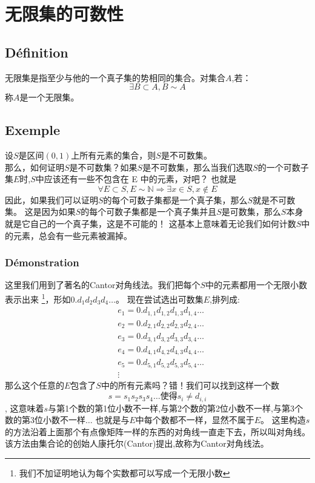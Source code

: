 \documentclass[12pt, a4paper, oneside]{ctexbook}
\begin{document}
\section{无限集的可数性}
  \subsection{Définition}
  无限集是指至少与他的一个真子集的势相同的集合。对集合$A$,若：
  $$
    \exists B\subset A, B\sim A
  $$
  称$A$是一个无限集。
  \subsection{Exemple}
  设$S$是区间$(0,1)$上所有元素的集合，则$S$是不可数集。\\

  那么，如何证明$S$是不可数集？如果$S$是不可数集，那么当我们选取$S$的一个可数子集$E$时,$S$中应该还有一些不包含在 E 中的元素，对吧？
  也就是
  $$
    \forall E\subset S,E\sim \mathbb{N}\Rightarrow \exists x\in S,x\notin E 
  $$
  因此，如果我们可以证明$S$的每个可数子集都是一个真子集，那么$S$就是不可数集。
  这是因为如果$S$的每个可数子集都是一个真子集并且$S$是可数集，那么$S$本身就是它自己的一个真子集，这是不可能的！
  这基本上意味着无论我们如何计数$S$中的元素，总会有一些元素被漏掉。
  \subsubsection{Démonstration}
  这里我们用到了著名的Cantor对角线法。我们把每个$S$中的元素都用一个无限小数表示出来
  \footnote{我们不加证明地认为每个实数都可以写成一个无限小数}，形如$0.d_1d_2d_3d_4\dots$。
  现在尝试选出可数集$E$,排列成:
  $$
  \begin{aligned}&
    e_1=0.d_{1,1}d_{1,2}d_{1,3}d_{1,4}\dots\\ &
    e_2=0.d_{2,1}d_{2,2}d_{2,3}d_{2,4}\dots\\ &
    e_3=0.d_{3,1}d_{3,2}d_{3,3}d_{3,4}\dots\\ &
    e_4=0.d_{4,1}d_{4,2}d_{4,3}d_{4,4}\dots\\ &
    e_5=0.d_{5,1}d_{5,2}d_{5,3}d_{5,4}\dots\\ &
    \vdots 
      \end{aligned}
  $$
  那么这个任意的$E$包含了$S$中的所有元素吗？错！我们可以找到这样一个数
  $$s=s_1s_2s_3s_4\dots\text{使得}s_i\neq d_{i,i}$$,
  这意味着$s$与第1个数的第1位小数不一样,与第2个数的第2位小数不一样,与第3个数的第3位小数不一样$\dots$
  也就是与$E$中每个数都不一样，显然不属于$E$。
  这里构造$s$的方法沿着上面那个有点像矩阵一样的东西的对角线一直走下去，所以叫对角线。
  该方法由集合论的创始人康托尔(Cantor)提出,故称为Cantor对角线法。
  
\end{document}

